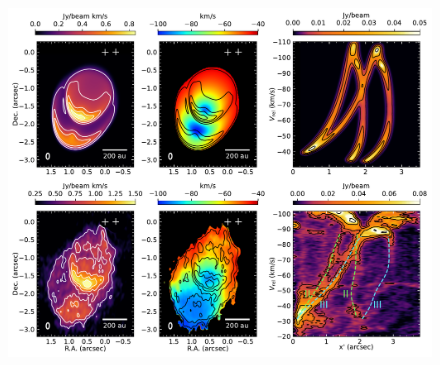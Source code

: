 \documentclass[12pt]{mythesis}
\begin{document}
\clearpage
\begin{figure}[p!]
\begin{center}
\includegraphics[width=1\textwidth]{figures/obs_model_moments.pdf}
\end{center}
\end{figure}
\addtocounter{figure}{-1}
\end{document}
